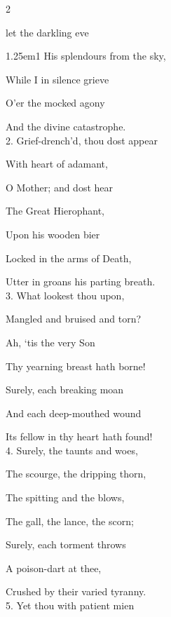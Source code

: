 \begin{paracol}{2}
\sloppy

\firstEvensong
{}

\firstEvensongHymn
{} let the darkling eve



\begin{hangparas}{1.25em}{1}
His splendours from the sky,

While I in silence grieve

O'er the mocked agony

And the divine catastrophe.\\

2. Grief-drench'd, thou dost appear

With heart of adamant,

O Mother; and dost hear

The Great Hierophant,

Upon his wooden bier

Locked in the arms of Death,

Utter in groans his parting breath.\\

3. What lookest thou upon,

Mangled and bruised and torn?

Ah, `tis the very Son

Thy yearning breast hath borne!

Surely, each breaking moan

And each deep-mouthed wound

Its fellow in thy heart hath found!\\

4. Surely, the taunts and woes,

The scourge, the dripping thorn,

The spitting and the blows,

The gall, the lance, the scorn;

Surely, each torment throws

A poison-dart at thee,

Crushed by their varied tyranny.\\

5. Yet thou with patient mien


\end{hangparas}
\end{paracol}
